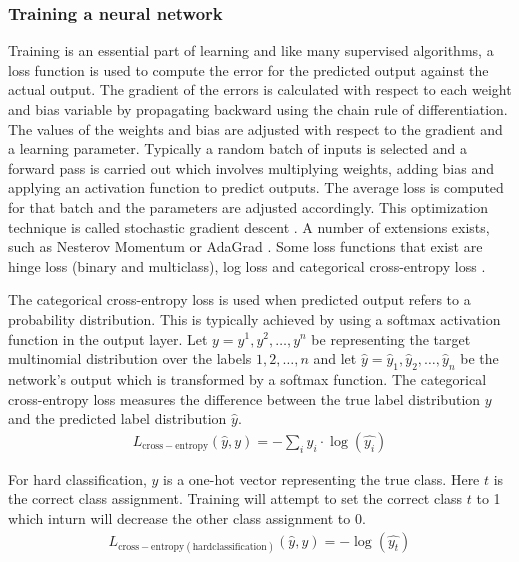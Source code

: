 \documentclass[a4paper, 11pt]{article}
\begin{document}
\subsubsection{Training a neural network}

Training is an essential part of learning and like many supervised algorithms, a loss function is used to compute the error for the predicted output against the actual output. The gradient of the errors is calculated with respect to each weight and bias variable by propagating backward using the chain rule of differentiation. The values of the weights and bias are adjusted with respect to the gradient and a learning parameter. Typically a random batch of inputs is selected and a forward pass is carried out which involves multiplying weights, adding bias and applying an activation function to predict outputs. The average loss is computed for that batch and the parameters are adjusted accordingly. This optimization technique is called stochastic gradient descent \parencite{Bottou2012}. A number of extensions exists, such as Nesterov Momentum \parencite{Sutskever2013} or AdaGrad \parencite{Duchi2011}. Some loss functions that exist are hinge loss (binary and multiclass), log loss and categorical cross-entropy loss \parencite{Goldberg2016}. 


The categorical cross-entropy loss is used when predicted output refers to a probability distribution. This is typically achieved by using a softmax activation function in the output layer. Let $y = y^{1}, y^{2}, \dots, y^{n}$ be representing the target multinomial distribution over the labels $1,2,\dots,n$ and let $ \hat{y} = \hat{y}_{1},\hat{y}_{2},\dots,\hat{y}_{n}$ be the network's output which is transformed by a softmax function. The categorical cross-entropy loss measures the difference between the true label distribution $y$ and the predicted label distribution $\hat{y}$. 
\begin{align*}
L_\mathrm{cross-entropy}(\hat{y},y) = -\sum_iy_i \cdot \log(\hat{y_i})
\end{align*}

For hard classification, $y$ is a one-hot vector representing the true class. Here $t$ is the correct class assignment. Training will attempt to set the correct class $t$ to 1 which inturn will decrease the other class assignment to 0.
\begin{align*}
L_{\mathrm{cross-entropy(hard classification)}}(\hat{y},y) = -\log(\hat{y_t})
\end{align*}
\end{document}
